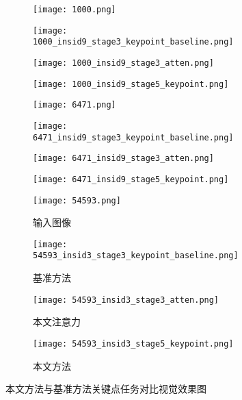 \begin{figure}[H]
	\begin{minipage}{\linewidth}
		\begin{subfigure}[b]{0.23\linewidth}
			\texttt{[image: 1000.png]}
		\end{subfigure}
		\begin{subfigure}[b]{0.23\linewidth}
			\texttt{[image: 1000\_insid9\_stage3\_keypoint\_baseline.png]}
		\end{subfigure}
		\begin{subfigure}[b]{0.23\linewidth}
			\texttt{[image: 1000\_insid9\_stage3\_atten.png]}
		\end{subfigure}
		\begin{subfigure}[b]{0.23\linewidth}
			\texttt{[image: 1000\_insid9\_stage5\_keypoint.png]}
		\end{subfigure}

		\vskip5pt
		\begin{subfigure}[b]{0.23\linewidth}
			\texttt{[image: 6471.png]}
		\end{subfigure}
		\begin{subfigure}[b]{0.23\linewidth}
			\texttt{[image: 6471\_insid9\_stage3\_keypoint\_baseline.png]}
		\end{subfigure}
		\begin{subfigure}[b]{0.23\linewidth}
			\texttt{[image: 6471\_insid9\_stage3\_atten.png]}
		\end{subfigure}
		\begin{subfigure}[b]{0.23\linewidth}
			\texttt{[image: 6471\_insid9\_stage5\_keypoint.png]}
		\end{subfigure}

		\vskip5pt
		\begin{subfigure}[b]{0.23\linewidth}
			\texttt{[image: 54593.png]}
			\caption{输入图像}
		\end{subfigure}
		\begin{subfigure}[b]{0.23\linewidth}
			\texttt{[image: 54593\_insid3\_stage3\_keypoint\_baseline.png]}
			\caption{基准方法}
		\end{subfigure}
		\begin{subfigure}[b]{0.23\linewidth}
			\texttt{[image: 54593\_insid3\_stage3\_atten.png]}
			\caption{本文注意力}
		\end{subfigure}
		\begin{subfigure}[b]{0.23\linewidth}
			\texttt{[image: 54593\_insid3\_stage5\_keypoint.png]}
			\caption{本文方法}
		\end{subfigure}
	\end{minipage}
	\caption{本文方法与基准方法关键点任务对比视觉效果图}
	\label{fig:comparison_keypoint}
\end{figure}

